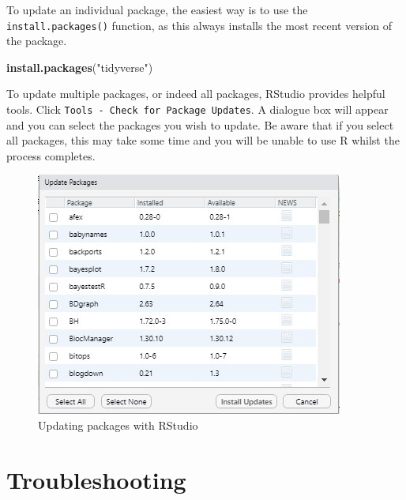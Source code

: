 \documentclass[
  oneside]{book}
\newenvironment{Shaded}{\begin{snugshade}}{\end{snugshade}}
\newcommand{\FunctionTok}[1]{\textcolor[rgb]{0.13,0.29,0.53}{\textbf{#1}}}
\newcommand{\NormalTok}[1]{#1}
\newcommand{\StringTok}[1]{\textcolor[rgb]{0.31,0.60,0.02}{#1}}
\begin{document}
To update an individual package, the easiest way is to use the \texttt{install.packages()} function, as this always installs the most recent version of the package.

\begin{Shaded}
\begin{Highlighting}[]
\FunctionTok{install.packages}\NormalTok{(}\StringTok{"tidyverse"}\NormalTok{)}
\end{Highlighting}
\end{Shaded}

To update multiple packages, or indeed all packages, RStudio provides helpful tools. Click \texttt{Tools\ -\ Check\ for\ Package\ Updates}. A dialogue box will appear and you can select the packages you wish to update. Be aware that if you select all packages, this may take some time and you will be unable to use R whilst the process completes.

\begin{figure}

{\centering \includegraphics[width=1\linewidth]{images/update_packages} 

}

\caption{Updating packages with RStudio}\label{fig:img-updateall}
\end{figure}

\hypertarget{package-install-troubleshooting}{%
\section{Troubleshooting}\label{package-install-troubleshooting}}
\end{document}
